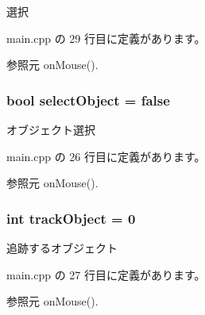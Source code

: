 選択 



 main.\-cpp の 29 行目に定義があります。



参照元 on\-Mouse().

\subsubsection[{select\-Object}]{\setlength{\rightskip}{0pt plus 5cm}bool select\-Object = false}\label{main_8cpp_a71a276a0dc4ef6aa35740b58f10bcb39}


オブジェクト選択 



 main.\-cpp の 26 行目に定義があります。



参照元 on\-Mouse().

\subsubsection[{track\-Object}]{\setlength{\rightskip}{0pt plus 5cm}int track\-Object = 0}\label{main_8cpp_a88f176e4e65e22a17093a8cd24003a66}


追跡するオブジェクト 



 main.\-cpp の 27 行目に定義があります。



参照元 on\-Mouse().

